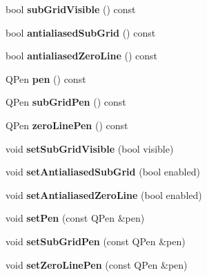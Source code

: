 \begin{DoxyCompactItemize}
\item 
bool {\bfseries sub\+Grid\+Visible} () const \hypertarget{class_q_c_p_grid_a0a8963e384d53cd77cbab7df96147458}{}\label{class_q_c_p_grid_a0a8963e384d53cd77cbab7df96147458}

\item 
bool {\bfseries antialiased\+Sub\+Grid} () const \hypertarget{class_q_c_p_grid_abfa6c638a05b45b2ed31b680fc9b31fc}{}\label{class_q_c_p_grid_abfa6c638a05b45b2ed31b680fc9b31fc}

\item 
bool {\bfseries antialiased\+Zero\+Line} () const \hypertarget{class_q_c_p_grid_a4dfbc1cee989d8cae1434b765ab2a13b}{}\label{class_q_c_p_grid_a4dfbc1cee989d8cae1434b765ab2a13b}

\item 
Q\+Pen {\bfseries pen} () const \hypertarget{class_q_c_p_grid_aca20b67548e3ae31fd02e6398ffd6cb9}{}\label{class_q_c_p_grid_aca20b67548e3ae31fd02e6398ffd6cb9}

\item 
Q\+Pen {\bfseries sub\+Grid\+Pen} () const \hypertarget{class_q_c_p_grid_ac698f8c6864b1d8f0e2af97ca4b39cc6}{}\label{class_q_c_p_grid_ac698f8c6864b1d8f0e2af97ca4b39cc6}

\item 
Q\+Pen {\bfseries zero\+Line\+Pen} () const \hypertarget{class_q_c_p_grid_a06ea986b651860446e1224d2097259b9}{}\label{class_q_c_p_grid_a06ea986b651860446e1224d2097259b9}

\item 
void {\bfseries set\+Sub\+Grid\+Visible} (bool visible)\hypertarget{class_q_c_p_grid_ad4ad6bf714ec45e08845456355a1b700}{}\label{class_q_c_p_grid_ad4ad6bf714ec45e08845456355a1b700}

\item 
void {\bfseries set\+Antialiased\+Sub\+Grid} (bool enabled)\hypertarget{class_q_c_p_grid_a5692310ba183721a413d60951407d114}{}\label{class_q_c_p_grid_a5692310ba183721a413d60951407d114}

\item 
void {\bfseries set\+Antialiased\+Zero\+Line} (bool enabled)\hypertarget{class_q_c_p_grid_a3cc6d54647393ee71afb6da56af07aa4}{}\label{class_q_c_p_grid_a3cc6d54647393ee71afb6da56af07aa4}

\item 
void {\bfseries set\+Pen} (const Q\+Pen \&pen)\hypertarget{class_q_c_p_grid_aa05ab9816ffb440908171e45e833b593}{}\label{class_q_c_p_grid_aa05ab9816ffb440908171e45e833b593}

\item 
void {\bfseries set\+Sub\+Grid\+Pen} (const Q\+Pen \&pen)\hypertarget{class_q_c_p_grid_a9edd3593f384d1f0b0202a39cef4453d}{}\label{class_q_c_p_grid_a9edd3593f384d1f0b0202a39cef4453d}

\item 
void {\bfseries set\+Zero\+Line\+Pen} (const Q\+Pen \&pen)\hypertarget{class_q_c_p_grid_a209f40fdb252397b418b82d3494d8ea0}{}\label{class_q_c_p_grid_a209f40fdb252397b418b82d3494d8ea0}

\end{DoxyCompactItemize}
